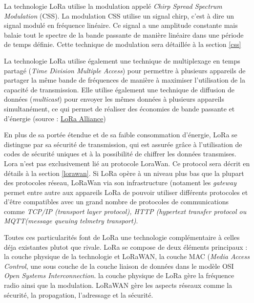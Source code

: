 \vspace{0.1cm}

La technologie LoRa utilise la modulation appelé \textit{Chirp Spread Spectrum Modulation} (CSS). La modulation CSS utilise un signal chirp, c'est à dire un signal modulé en fréquence linéaire. Ce signal a une amplitude constante mais balaie tout le spectre de la bande passante de manière linéaire dans une période de temps définie. Cette technique de modulation sera détaillée à la section \ref{css}

\vspace{0.1cm}

La technologie LoRa utilise également une technique de multiplexage en temps partagé (\textit{Time Division Multiple Access}) pour permettre à plusieurs appareils de partager la même bande de fréquences de manière à maximiser l'utilisation de la capacité de transmission. Elle utilise également une technique de diffusion de données (\textit{multicast}) pour envoyer les mêmes données à plusieurs appareils simultanément, ce qui permet de réaliser des économies de bande passante et d'énergie (source : \href{https://resources.lora-alliance.org/technical-trainings/lorawan-device-to-device-multicast-communications}{LoRa Alliance})

\vspace{0.1cm}

En plus de sa portée étendue et de sa faible consommation d'énergie, LoRa se distingue par sa sécurité de transmission, qui est assurée grâce à l'utilisation de codes de sécurité uniques et à la possibilité de chiffrer les données transmises. Lora n'est pas exclusivement lié au protocole LoraWan. Ce protocol sera décrit en détails à la section \ref{lorawan}. Si LoRa opère à un niveau plus bas que la plupart des protocoles réseau, LoRaWan via son infrastructure (notament les \textit{gateway} permet entre autre aux appareils LoRa de pouvoir utiliser différents protocoles et d'être compatibles avec un grand nombre de protocoles de communications comme \textit{TCP/IP (transport layer protocol), HTTP (hypertext transfer protocol ou MQTT(message queuing telmetry transport)}.

\vspace{0.1cm}

Toutes ces  particularités font de LoRa une technologie complémentaire à celles déja existantes plutot que rivale.
LoRa se compose de deux éléments principaux : la couche physique de la technologie et LoRaWAN, la couche MAC (\textit{Media Access Control}, une sous couche de la couche liaison de données dans le modèle OSI \textit{Open Systems Interconnection}. la couche physique de LoRa gère la fréquence radio ainsi que la modulation. LoRaWAN gère les aspects réseaux comme la sécurité, la propagation, l'adressage et la sécurité.

